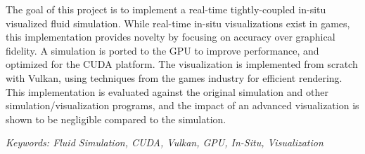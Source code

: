 The goal of this project is to implement a 
real-time tightly-coupled in-situ visualized fluid simulation.
While real-time in-situ visualizations exist in games, this implementation provides novelty by focusing on accuracy over graphical fidelity.
A simulation is ported to the GPU to improve performance, and optimized for the CUDA platform.
The visualization is implemented from scratch with Vulkan, using techniques from the games industry for efficient rendering.
This implementation is evaluated against the original simulation and other simulation/visualization programs, and the impact of an advanced visualization is shown to be negligible compared to the simulation.

\vspace{0.5cm}

\noindent \textit{Keywords: Fluid Simulation, CUDA, Vulkan, GPU, In-Situ, Visualization}